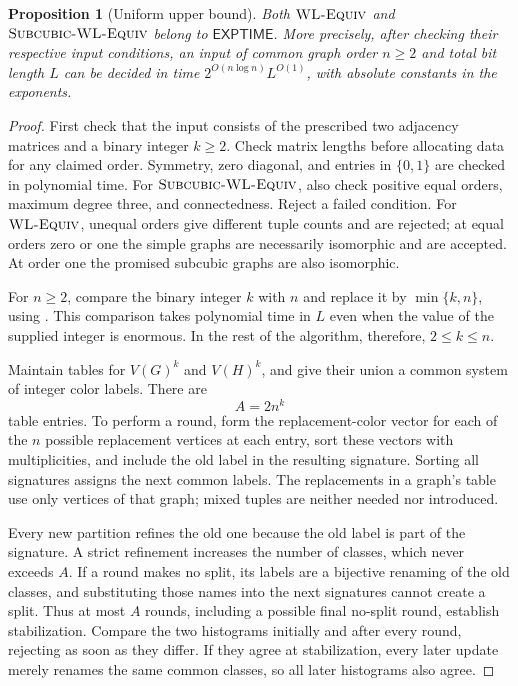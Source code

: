 \documentclass[11pt]{article}
\newtheorem{proposition}[theorem]{Proposition}
\theoremstyle{definition}
\begin{document}
\begin{proposition}[Uniform upper bound]
\label{prop:membership}
Both \(\textnormal{\textsc{WL-Equiv}}\) and \(\textnormal{\textsc{Subcubic-WL-Equiv}}\) belong to \(\mathsf{EXPTIME}\).
More precisely, after checking their respective input conditions,
an input of common graph order \(n\ge2\) and total bit length \(L\)
can be decided in time
$2^{O(n\log n)}L^{O(1)}$, with absolute constants in the exponents.
\end{proposition}

\begin{proof}
First check that the input consists of the prescribed two adjacency matrices
and a binary integer $k\geq 2$.  Check matrix lengths before allocating data
for any claimed order.  Symmetry, zero diagonal, and entries in \(\{0,1\}\) are checked in
polynomial time. For \(\textnormal{\textsc{Subcubic-WL-Equiv}}\), also check positive equal orders,
maximum degree three, and connectedness. Reject a failed condition.
For \(\textnormal{\textsc{WL-Equiv}}\), unequal orders give different tuple counts and are
rejected; at equal orders zero or one the simple graphs are necessarily
isomorphic and are accepted. At order one the promised subcubic graphs
are also isomorphic.

For $n\geq 2$, compare the binary integer $k$ with $n$ and replace it by
$\min\{k,n\}$, using .  This comparison takes
polynomial time in $L$ even when the value of the supplied integer is
enormous.  In the rest of the algorithm, therefore, $2\leq k\leq n$.

Maintain tables for $V(G)^k$ and $V(H)^k$, and give their union a common
system of integer color labels.  There are
\[
 A=2n^k
\]
table entries.  To perform a round, form the replacement-color vector for
each of the $n$ possible replacement vertices at each entry, sort these
vectors with multiplicities, and include the old label in the resulting
signature.  Sorting all signatures assigns the next common labels.  The
replacements in a graph's table use only vertices of that graph; mixed
tuples are neither needed nor introduced.

Every new partition refines the old one because the old label is part of
the signature.  A strict refinement increases the number of classes, which
never exceeds $A$.  If a round makes no split, its labels are a bijective
renaming of the old classes, and substituting those names into the next
signatures cannot create a split.  Thus at most $A$ rounds, including a
possible final no-split round, establish stabilization.  Compare the two
histograms initially and after every round, rejecting as soon as they
differ.  If they agree at stabilization, every later update merely renames
the same common classes, so all later histograms also agree.


\end{proof}
\end{document}
